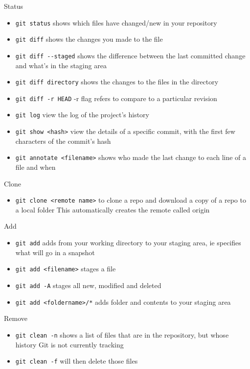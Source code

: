 \documentclass[
]{book}
\providecommand{\tightlist}{%
  \setlength{\itemsep}{0pt}\setlength{\parskip}{0pt}}
\begin{document}
Status

\begin{itemize}
\tightlist
\item
  \texttt{git\ status} shows which files have changed/new in your repository
\item
  \texttt{git\ diff} shows the changes you made to the file
\item
  \texttt{git\ diff\ -\/-staged} shows the difference between the last committed change and what's in the staging area
\item
  \texttt{git\ diff\ directory} shows the changes to the files in the directory
\item
  \texttt{git\ diff\ -r\ HEAD} -r flag refers to compare to a particular revision
\item
  \texttt{git\ log} view the log of the project's history
\item
  \texttt{git\ show\ \textless{}hash\textgreater{}} view the details of a specific commit, with the first few characters of the commit's hash
\item
  \texttt{git\ annotate\ \textless{}filename\textgreater{}} shows who made the last change to each line of a file and when
\end{itemize}

Clone

\begin{itemize}
\tightlist
\item
  \texttt{git\ clone\ \textless{}remote\ name\textgreater{}} to clone a repo and download a copy of a repo to a local folder This automatically creates the remote called origin
\end{itemize}

Add

\begin{itemize}
\tightlist
\item
  \texttt{git\ add} adds from your working directory to your staging area, ie specifies what will go in a snapshot
\item
  \texttt{git\ add\ \textless{}filename\textgreater{}} stages a file
\item
  \texttt{git\ add\ -A} stages all new, modified and deleted
\item
  \texttt{git\ add\ \textless{}foldername\textgreater{}/*} adds folder and contents to your staging area
\end{itemize}

Remove

\begin{itemize}
\tightlist
\item
  \texttt{git\ clean\ -n} shows a list of files that are in the repository, but whose history Git is not currently tracking
\item
  \texttt{git\ clean\ -f} will then delete those files
\end{itemize}
\end{document}
